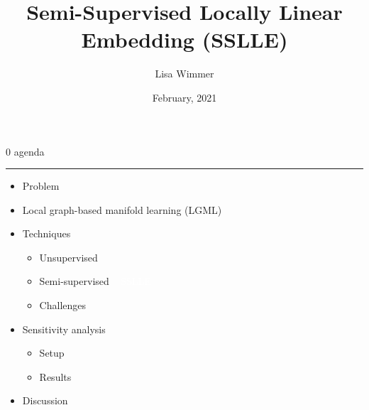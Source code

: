 \documentclass[11pt, compress, t, notes = noshow, xcolor = table, 
aspectratio = 1610]{beamer}
\title{Semi-Supervised Locally Linear Embedding (SSLLE)}
\author{Lisa Wimmer}
\date{February, 2021}
\newcommand{\maketag}[1]{\colorbox{highlightcol}{\textcolor{white}
{\MakeUppercase{#1}}}}
\newcommand{\highlight}[1]{\textcolor{highlightcol}{\textbf{#1}}}
\newcommand{\flexitem}[1]{\item[$\highlight{#1}$]}
\begin{document}


\LARGE
\begin{frame}{\textcolor{gray!90}{0 agenda}}
\normalsize
\vspace{-0.5cm}
\noindent \textcolor{gray!90}{\rule{\textwidth}{1pt}}
\smallskip

\begin{itemize}
\large
\flexitem{1} Problem
\flexitem{2} Local graph-based manifold learning (LGML)
\flexitem{3} Techniques
\begin{itemize}
  \large
  \flexitem{1} Unsupervised
  \flexitem{2} Semi-supervised ~ \maketag{SSLLE}
  \flexitem{3} Challenges
\end{itemize}
\flexitem{4} Sensitivity analysis
\begin{itemize}
  \large
  \flexitem{1} Setup
  \flexitem{2} Results
\end{itemize}
\flexitem{5} Discussion
\end{itemize}

\end{frame}

\end{document}
